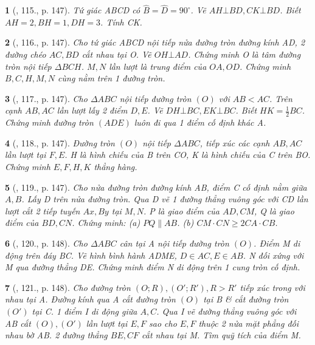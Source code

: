 \documentclass{article}
\newtheorem{baitoan}{}
\begin{document}
\begin{baitoan}[\cite{Tuyen_Toan_9_old}, 115., p. 147]
	Tứ giác ABCD có $\widehat{B} = \widehat{D} = 90^\circ$. Vẽ $AH\bot BD,CK\bot BD$. Biết $AH = 2,BH = 1,DH = 3$. Tính CK.
\end{baitoan}

\begin{baitoan}[\cite{Tuyen_Toan_9_old}, 116., p. 147]
	Cho tứ giác ABCD nội tiếp nửa đường tròn đường kính AD, 2 đường chéo $AC,BD$ cắt nhau tại O. Vẽ $OH\bot AD$. Chứng minh O là tâm đường tròn nội tiếp $\Delta BCH$. $M,N$ lần lượt là trung điểm của $OA,OD$. Chứng minh $B,C,H,M,N$ cùng nằm trên 1 đường tròn.
\end{baitoan}

\begin{baitoan}[\cite{Tuyen_Toan_9_old}, 117., p. 147]
	Cho $\Delta ABC$ nội tiếp đường tròn $(O)$ với $AB < AC$. Trên cạnh $AB,AC$ lần lượt lấy 2 điểm $D,E$. Vẽ $DH\bot BC,EK\bot BC$. Biết $HK = \frac{1}{2}BC$. Chứng minh đường tròn $(ADE)$ luôn đi qua 1 điểm cố định khác A.
\end{baitoan}

\begin{baitoan}[\cite{Tuyen_Toan_9_old}, 118., p. 147]
	Đường tròn $(O)$ nội tiếp $\Delta ABC$, tiếp xúc các cạnh $AB,AC$ lần lượt tại $F,E$. H là hình chiếu của B trên CO, K là hình chiếu của C trên BO. Chứng minh $E,F,H,K$ thẳng hàng.
\end{baitoan}

\begin{baitoan}[\cite{Tuyen_Toan_9_old}, 119., p. 147]
	Cho nửa đường tròn đường kính AB, điểm C cố định nằm giữa $A,B$. Lấy D trên nửa đường tròn. Qua D vẽ 1 đường thẳng vuông góc với CD lần lượt cắt 2 tiếp tuyến $Ax,By$ tại $M,N$. P là giao điểm của $AD,CM$, Q là giao điểm của $BD,CN$. Chứng minh: (a) $PQ\parallel AB$. (b) $CM\cdot CN\ge2CA\cdot CB$.
\end{baitoan}

\begin{baitoan}[\cite{Tuyen_Toan_9_old}, 120., p. 148]
	Cho $\Delta ABC$ cân tại A nội tiếp đường tròn $(O)$. Điểm M di động trên đáy BC. Vẽ hình bình hành ADME, $D\in AC,E\in AB$. N đối xứng với M qua đường thẳng DE. Chứng minh điểm N di động trên 1 cung tròn cố định.
\end{baitoan}

\begin{baitoan}[\cite{Tuyen_Toan_9_old}, 121., p. 148]
	Cho đường tròn $(O;R),(O';R'),R > R'$ tiếp xúc trong với nhau tại A. Đường kính qua A cắt đường tròn $(O)$ tại B \& cắt đường tròn $(O')$ tại C. 1 điểm I di động giữa $A,C$. Qua I vẽ đường thẳng vuông góc với AB cắt $(O),(O')$ lần lượt tại $E,F$ sao cho $E,F$ thuộc 2 nửa mặt phẳng đối nhau bờ AB. 2 đường thẳng $BE,CF$ cắt nhau tại M. Tìm quỹ tích của điểm M.
\end{baitoan}
\end{document}
